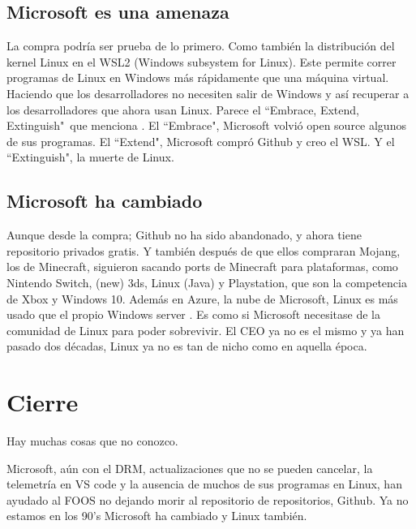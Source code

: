 \documentclass[12pt, twoside]{article}
\begin{document}
\subsection{Microsoft es una amenaza}%
\label{sub:Microsoft es una amenaza}

La compra podría ser prueba de lo primero.
Como también la distribución del kernel Linux en el WSL2 (Windows subsystem for Linux). \citet{WSL2}
Este permite correr programas de Linux en Windows más rápidamente que una máquina virtual.
Haciendo que los desarrolladores no necesiten salir de Windows y así recuperar a los desarrolladores que ahora usan Linux. \citet{STACK}
Parece el ``Embrace, Extend, Extinguish"\ que menciona \citet{WSL2}.
El ``Embrace", Microsoft volvió open source algunos de sus programas.
El ``Extend", Microsoft compró Github y creo el WSL.
Y el ``Extinguish", la muerte de Linux.
\subsection{Microsoft ha cambiado}%
\label{sub:Microsoft ha cambiado}

Aunque desde la compra; Github no ha sido abandonado, y ahora tiene repositorio privados gratis.
Y también después de que ellos compraran Mojang, los de Minecraft, siguieron sacando ports de Minecraft para plataformas,
como Nintendo Switch, (new) 3ds, Linux (Java) y Playstation, que son la competencia de Xbox y Windows 10.
Además en Azure, la nube de Microsoft, Linux es más usado que el propio Windows server \citet{AZURE}.
Es como si Microsoft necesitase de la comunidad de Linux para poder sobrevivir.
El CEO ya no es el mismo y ya han pasado dos décadas, Linux ya no es tan de nicho como en aquella época.

\section{Cierre}%
\label{sec:Cierre}

Hay muchas cosas que no conozco.

Microsoft, aún con el DRM, actualizaciones que no se pueden cancelar, la telemetría en VS code y la ausencia de muchos de sus programas en Linux,
han ayudado al FOOS no dejando morir al repositorio de repositorios, Github.
Ya no estamos en los 90's Microsoft ha cambiado y Linux también.
\newpage
\vfill
\nocite{*}
\printbibliography
\end{document}
